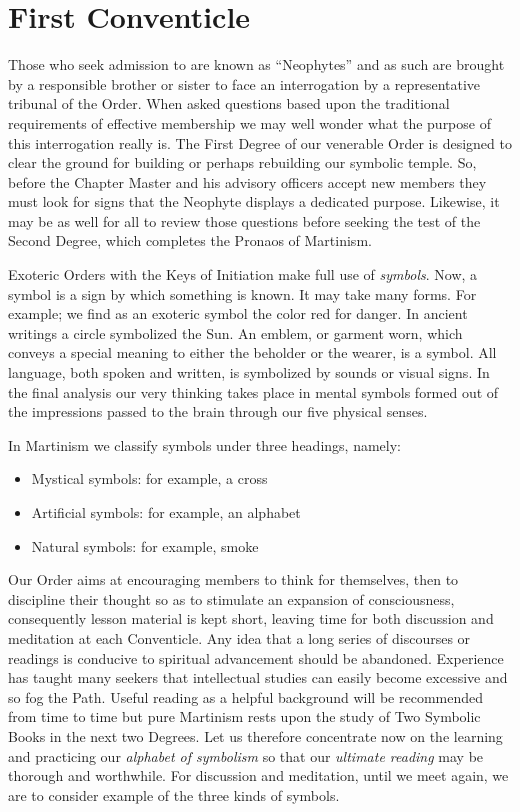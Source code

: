 \section{First Conventicle}

Those who seek admission to \mouplong{} are known as ``Neophytes'' and as such are brought by a responsible brother or sister to face an interrogation by a representative tribunal of the Order. When asked questions based upon the traditional requirements of effective membership we may well wonder what the purpose of this interrogation really is. The First Degree of our venerable Order is designed to clear the ground for building or perhaps rebuilding our symbolic temple. So, before the Chapter Master and his advisory officers accept new members they must look for signs that the Neophyte displays a dedicated purpose. Likewise, it may be as well for all to review those questions before seeking the test of the Second Degree, which completes the Pronaos of Martinism. 

Exoteric Orders with the Keys of Initiation make full use of \textit{symbols}. Now, a symbol is a sign by which
something is known. It may take many forms. For example; we find as an exoteric symbol the color
red for danger. In ancient writings a circle symbolized the Sun. An emblem, or garment worn, which
conveys a special meaning to either the beholder or the wearer, is a symbol. All language, both spoken
and written, is symbolized by sounds or visual signs. In the final analysis our very thinking takes place
in mental symbols formed out of the impressions passed to the brain through our five physical senses. 

In Martinism we classify symbols under three headings, namely: 

\begin{itemize}
    \item Mystical symbols: for example, a cross
    \item Artificial symbols: for example, an alphabet
    \item Natural symbols: for example, smoke
\end{itemize}

Our Order aims at encouraging members to think for themselves, then to discipline their thought so as
to stimulate an expansion of consciousness, consequently lesson material is kept short, leaving time for
both discussion and meditation at each Conventicle. Any idea that a long series of discourses or
readings is conducive to spiritual advancement should be abandoned. Experience has taught many
seekers that intellectual studies can easily become excessive and so fog the Path. Useful reading as a
helpful background will be recommended from time to time but pure Martinism rests upon the study
of Two Symbolic Books in the next two Degrees. Let us therefore concentrate now on the learning and
practicing our \textit{alphabet of symbolism} so that our \textit{ultimate reading} may be thorough and worthwhile.
For discussion and meditation, until we meet again, we are to consider example of the three kinds of
symbols. 


